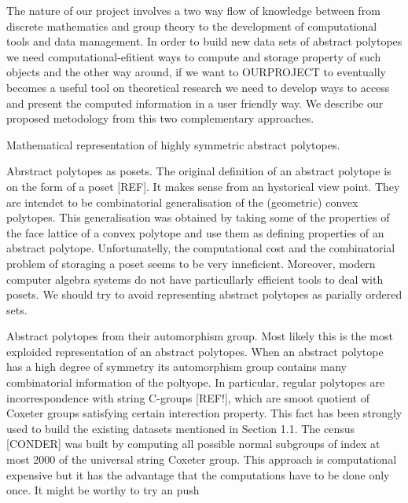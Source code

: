 %
%

The nature of our project involves a two way flow of knowledge between from discrete mathematics and group theory to the development of computational tools and data management. In order to build new data sets of abstract polytopes we need computational-efitient ways to compute and storage property of such objects and the other way around, if we want to OURPROJECT to eventually becomes a useful tool on theoretical research we need to develop ways to access and present the computed information in a user friendly way. We describe our proposed metodology from this two complementary approaches.

Mathematical representation of highly symmetric abstract polytopes.

Abrstract polytopes as posets. The original definition of an abstract polytope is on the form of a poset [REF]. It makes sense from an hystorical view point. They are intendet to be combinatorial generalisation of the (geometric) convex polytopes. This generalisation was obtained by taking some of the properties of the face lattice of a convex polytope and use them as defining properties of an abstract polytope. Unfortunatelly, the computational cost and the combinatorial problem of storaging a poset seems to be very inneficient. Moreover, modern computer algebra systems do not have particullarly efficient tools to deal with posets. We should try to avoid representing abstract polytopes as parially ordered sets.

Abstract polytopes from their automorphism group. Most likely this is the most exploided representation of an abstract polytopes. When an abstract polytope has a high degree of symmetry its automorphism group contains many combinatorial information of the poltyope. In particular, regular polytopes are incorrespondence with string C-groups [REF!], which are smoot quotient of Coxeter groups satisfying certain interection property. This fact has been strongly used to build the existing datasets mentioned in Section 1.1. The census [CONDER] was built by computing all possible normal subgroups of index at most 2000 of the universal string Coxeter group. This approach is computational expensive but it has the advantage that the computations have to be done only once. It might be worthy to try an push




%
